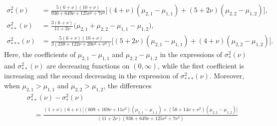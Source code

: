 \documentclass[11pt]{article}
\begin{document}
\begin{subequations}\label{sec5-case3-eq4}
\begin{align}
\sigma^2_{*}(\nu)&=\frac{5(6+\nu)(10+\nu)}{936+ 649\nu+125\nu^2+7\nu^3}\Big[(4+\nu)(\mu_{2,1}-\mu_{1,1})+(5+2\nu)
(\mu_{2,2}-\mu_{1,2})\Big],\\
\sigma^2_{**}(\nu)&=\frac{3(6+\nu)}{11+2\nu}\Big(\mu_{2,1}+\mu_{2,2}-\mu_{1,1}-\mu_{1,2}\Big),\\
\sigma^2_{***}(\nu)&=\frac{5(6+\nu)(10+\nu)}{3(238+122\nu+20\nu^2+\nu^3)}\Big[(5+2\nu)(\mu_{2,1}-\mu_{1,1})+(4+\nu)
(\mu_{2,2}-\mu_{1,2})\Big].
\end{align}
\end{subequations}
Here, the coefficients of $\mu_{2,1}-\mu_{1,1}$ and $\mu_{2,2}-\mu_{1,2}$ in the expressions of
$\sigma^2_{*}(\nu)$ and $\sigma^2_{**}(\nu)$ are decreasing functions on $(0,\infty)$, while the first coefficient is increasing and the second decreasing in the expression of
$\sigma^2_{***}(\nu)$. 
Moreover, when $\mu_{2,1}>\mu_{1,1}$ and $\mu_{2,2}>\mu_{1,2}$, the differences
\begin{align}\label{sec5-case3-eq5}
&\sigma^2_{**}(\nu)-\sigma^2_{*}(\nu)\nonumber\\
&\quad=\frac{(1+\nu)(6+\nu)\Big[(608+169\nu+11\nu^2)(\mu_{2,1}-\mu_{1,1})+(58+14\nu+\nu^2)(\mu_{2,2}-\mu_{1,2})\Big]}
{(11+2\nu)(936+649\nu+125\nu^2+7\nu^3)}
\end{align}
\end{document}
